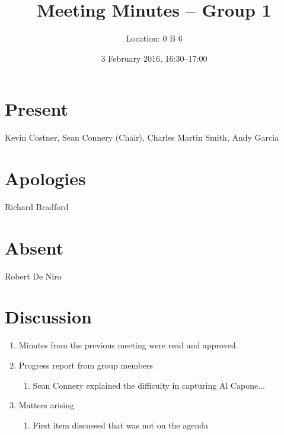 \documentclass[11pt,a4paper]{article}
\title{Meeting Minutes -- Group 1}
\author{Location: 0 B 6}
\date{3 February 2016, 16:30--17:00}
\begin{document}
\maketitle

\section*{Present}
Kevin Costner,
Sean Connery (Chair),
Charles Martin Smith,
Andy Garcia

\section*{Apologies}
Richard Bradford

\section*{Absent}
Robert De Niro

\section*{Discussion}

\begin{enumerate}


\item Minutes from the previous meeting were read and approved.

\item Progress report from group members
   \begin{enumerate}
   \item Sean Connery explained the difficulty in capturing Al Capone...
   \end{enumerate}


\item Matters arising
   \begin{enumerate}
   \item First item discussed that was not on the agenda
   \end{enumerate}

\end{enumerate}
\end{document}
